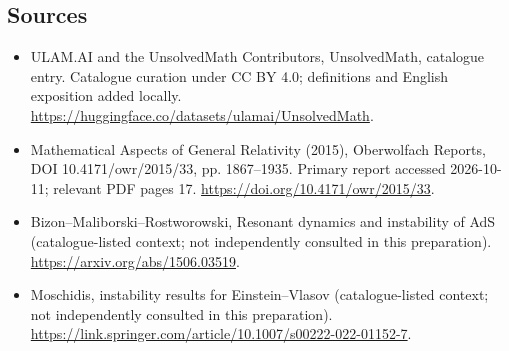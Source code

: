\documentclass[11pt]{article}
\begin{document}
\subsection{Sources}
\begin{itemize}
\item[\hypertarget{source:statement:1}{S1}] ULAM.AI and the UnsolvedMath Contributors, UnsolvedMath, catalogue entry. Catalogue curation under CC BY 4.0; definitions and English exposition added locally.
\url{https://huggingface.co/datasets/ulamai/UnsolvedMath}.
\item[\hypertarget{source:statement:2}{S2}] Mathematical Aspects of General Relativity (2015), Oberwolfach Reports, DOI 10.4171/owr/2015/33, pp. 1867--1935. Primary report accessed 2026-10-11; relevant PDF pages 17.
\url{https://doi.org/10.4171/owr/2015/33}.
\item[\hypertarget{source:statement:3}{S3}] Bizon--Maliborski--Rostworowski, Resonant dynamics and instability of AdS (catalogue-listed context; not independently consulted in this preparation).
\url{https://arxiv.org/abs/1506.03519}.
\item[\hypertarget{source:statement:4}{S4}] Moschidis, instability results for Einstein--Vlasov (catalogue-listed context; not independently consulted in this preparation).
\url{https://link.springer.com/article/10.1007/s00222-022-01152-7}.
\end{itemize}
\label{end:statement}
\end{document}
